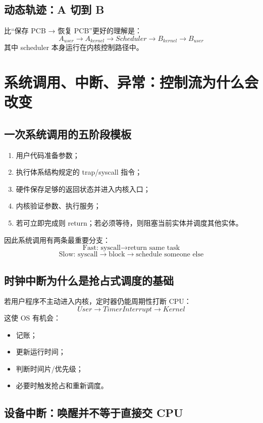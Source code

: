 \documentclass[11pt,a4paper]{ctexart}
\begin{document}
\subsection{动态轨迹：A 切到 B}

比“保存 PCB → 恢复 PCB”更好的理解是：
\[
A_{user}\rightarrow A_{kernel}\rightarrow Scheduler\rightarrow B_{kernel}\rightarrow B_{user}
\]
其中 scheduler 本身运行在内核控制路径中。

\section{系统调用、中断、异常：控制流为什么会改变}

\subsection{一次系统调用的五阶段模板}

\begin{enumerate}
\item 用户代码准备参数；
\item 执行体系结构规定的 trap/syscall 指令；
\item 硬件保存足够的返回状态并进入内核入口；
\item 内核验证参数、执行服务；
\item 若可立即完成则 return；若必须等待，则阻塞当前实体并调度其他实体。
\end{enumerate}

因此系统调用有两条最重要分支：
\[
\boxed{\text{Fast: syscall}\rightarrow\text{return same task}}
\]
\[
\boxed{\text{Slow: syscall}\rightarrow\text{block}\rightarrow\text{schedule someone else}}
\]

\subsection{时钟中断为什么是抢占式调度的基础}

若用户程序不主动进入内核，定时器仍能周期性打断 CPU：
\[
User\rightarrow TimerInterrupt\rightarrow Kernel
\]
这使 OS 有机会：
\begin{itemize}
\item 记账；
\item 更新运行时间；
\item 判断时间片/优先级；
\item 必要时触发抢占和重新调度。
\end{itemize}

\subsection{设备中断：唤醒并不等于直接交 CPU}
\end{document}
